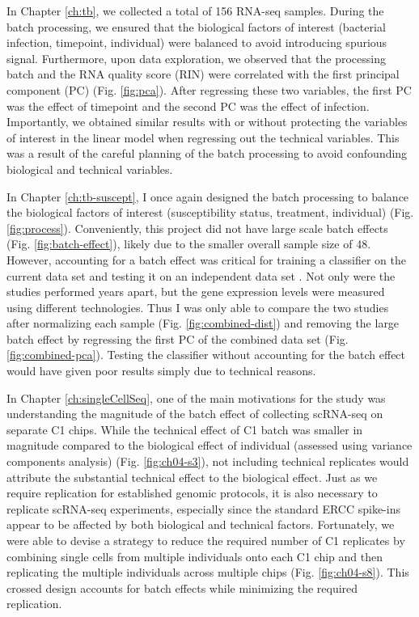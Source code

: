 In Chapter \ref{ch:tb}, we collected a total of 156 RNA-seq
samples. During the batch processing, we ensured that the biological
factors of interest (bacterial infection, timepoint, individual) were
balanced to avoid introducing spurious signal. Furthermore, upon data
exploration, we observed that the processing batch and the RNA quality
score (RIN) were correlated with the first principal component (PC)
(Fig. \ref{fig:pca}). After regressing these two variables, the first
PC was the effect of timepoint and the second PC was the effect of
infection. Importantly, we obtained similar results with or without
protecting the variables of interest in the linear model when
regressing out the technical variables. This was a result of the
careful planning of the batch processing to avoid confounding
biological and technical variables.

In Chapter \ref{ch:tb-suscept}, I once again designed the batch
processing to balance the biological factors of interest
(susceptibility status, treatment, individual)
(Fig. \ref{fig:process}). Conveniently, this project did not have
large scale batch effects (Fig. \ref{fig:batch-effect}), likely due to
the smaller overall sample size of 48. However, accounting for a batch
effect was critical for training a classifier on the current data set
and testing it on an independent data set \citep{Barreiro2012}.  Not
only were the studies performed years apart, but the gene expression
levels were measured using different technologies. Thus I was only
able to compare the two studies after normalizing each sample
(Fig. \ref{fig:combined-dist}) and removing the large batch effect by
regressing the first PC of the combined data set
(Fig. \ref{fig:combined-pca}). Testing the classifier without
accounting for the batch effect would have given poor results simply
due to technical reasons.

In Chapter \ref{ch:singleCellSeq}, one of the main motivations for the
study was understanding the magnitude of the batch effect of
collecting scRNA-seq on separate C1 chips. While the technical effect
of C1 batch was smaller in magnitude compared to the biological effect
of individual (assessed using variance components analysis)
(Fig. \ref{fig:ch04-s3}), not including technical replicates would
attribute the substantial technical effect to the biological
effect. Just as we require replication for established genomic
protocols, it is also necessary to replicate scRNA-seq experiments,
especially since the standard ERCC spike-ins appear to be affected by
both biological and technical factors. Fortunately, we were able to
devise a strategy to reduce the required number of C1 replicates by
combining single cells from multiple individuals onto each C1 chip and
then replicating the multiple individuals across multiple chips
(Fig. \ref{fig:ch04-s8}). This crossed design accounts for batch
effects while minimizing the required replication.

